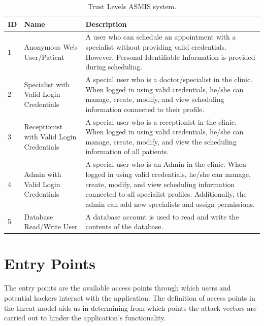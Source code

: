 \begingroup
\begin{table}[h!]
\centering
\setlength{\tabcolsep}{6.5pt} %
\renewcommand{\arraystretch}{1.8} %
\begin{tabular}{ |p{1cm}|p{6cm}|p{8cm}|}
 \hline
 \textbf{ID} & \textbf{Name} & \textbf{Description} \\ [0.5ex] 
 \hline
 1 & Anonymous Web User/Patient & A user who can schedule an appointment with a specialist without providing valid credentials. However, Personal Identifiable Information is provided during scheduling. \\
 \hline
 2 & Specialist with Valid Login Credentials & A special user who is a doctor/specialist in the clinic. When logged in using valid credentials, he/she can manage, create, modify, and view scheduling information connected to their profile. \\
 \hline
 3 & Receptionist with Valid Login Credentials & A special user who is a receptionist in the clinic. When logged in using valid credentials, he/she can manage, create, modify, and view the scheduling information of all patients. \\
 \hline
 4 & Admin with Valid Login Credentials & A special user who is an Admin in the clinic. When logged in using valid credentials, he/she can manage, create, modify, and view scheduling information connected to all specialist profiles. Additionally, the admin can add new specialists and assign permissions.\\
 \hline
 5 & Database Read/Write User & A database account is used to read and write the contents of the database.  \\ [1ex]
 \hline
\end{tabular}
\caption{Trust Levels ASMIS system.}
\label{table:trust_levels}
\end{table}
\endgroup

\section{Entry Points}
The entry points are the available access points through which users and potential hackers interact with the application. The definition of access points in the threat model aids us in determining from which points the attack vectors are carried out to hinder the application's functionality.\newline

